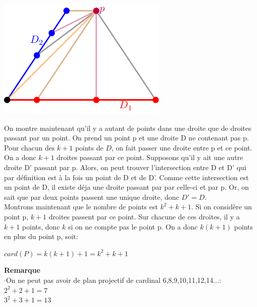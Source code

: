 \documentclass[a4paper]{article}
\begin{document}
\begin{center}
  \includegraphics[scale=1]{preuve.pdf}
  \end{center}
On montre maintenant qu'il y a autant de points dans une droite que de droites passant par un point. On prend un point p et une droite D ne contenant pas p. Pour chacun des $k+1$ points de $D$, on fait passer une droite entre p et ce point. On a donc $k+1$ droites passant par ce point. Supposons qu'il y ait une autre droite D' passant par p. Alors, on peut trouver l'intersection entre D et D' qui par définition est à la fois un point de D et de D'. Comme cette intersection est un point de D, il existe déja une droite passant par par celle-ci et par p. Or, on sait que par deux points passent une unique droite, donc $D'=D$.\\
Montrons maintenant que le nombre de points est $k^2+k+1$. Si on considère un point p, $k+1$ droites passent par ce point. Sur chacune de ces droites, il y a $k+1$ points, donc $k$ si on ne compte pas le point p. On a donc $k(k+1)$ points en plus du point p, soit:
\begin{center}
$card(P)=k(k+1)+1=k^2+k+1$
\end{center}
\bigskip
\textbf{Remarque}\\
$\cdot$On ne peut pas avoir de plan projectif de cardinal 6,8,9,10,11,12,14...: \\
$2^2+2+1=7$ \\
  $3^2+3+1=13$\\
\end{document}
